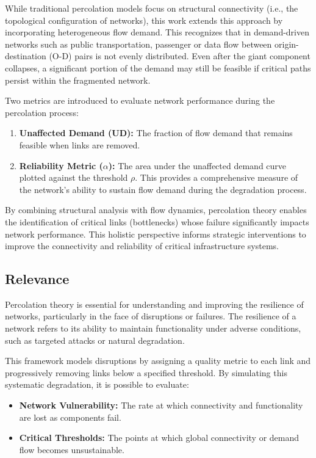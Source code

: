 \documentclass[
  letterpaper,
  DIV=11,
  numbers=noendperiod]{scrartcl}
\providecommand{\tightlist}{%
  \setlength{\itemsep}{0pt}\setlength{\parskip}{0pt}}\usepackage{longtable,booktabs,array}
\begin{document}
While traditional percolation models focus on structural connectivity
(i.e., the topological configuration of networks), this work extends
this approach by incorporating heterogeneous flow demand. This
recognizes that in demand-driven networks such as public transportation,
passenger or data flow between origin-destination (O-D) pairs is not
evenly distributed. Even after the giant component collapses, a
significant portion of the demand may still be feasible if critical
paths persist within the fragmented network.

Two metrics are introduced to evaluate network performance during the
percolation process:

\begin{enumerate}
\def\labelenumi{\arabic{enumi}.}
\tightlist
\item
  \textbf{Unaffected Demand (UD):} The fraction of flow demand that
  remains feasible when links are removed.
\item
  \textbf{Reliability Metric (\(\alpha\)):} The area under the
  unaffected demand curve plotted against the threshold \(\rho\). This
  provides a comprehensive measure of the network's ability to sustain
  flow demand during the degradation process.
\end{enumerate}

By combining structural analysis with flow dynamics, percolation theory
enables the identification of critical links (bottlenecks) whose failure
significantly impacts network performance. This holistic perspective
informs strategic interventions to improve the connectivity and
reliability of critical infrastructure systems.

\subsection{Relevance}\label{relevance}

Percolation theory is essential for understanding and improving the
resilience of networks, particularly in the face of disruptions or
failures. The resilience of a network refers to its ability to maintain
functionality under adverse conditions, such as targeted attacks or
natural degradation.

This framework models disruptions by assigning a quality metric to each
link and progressively removing links below a specified threshold. By
simulating this systematic degradation, it is possible to evaluate:

\begin{itemize}
\tightlist
\item
  \textbf{Network Vulnerability:} The rate at which connectivity and
  functionality are lost as components fail.
\item
  \textbf{Critical Thresholds:} The points at which global connectivity
  or demand flow becomes unsustainable.
\end{itemize}
\end{document}

